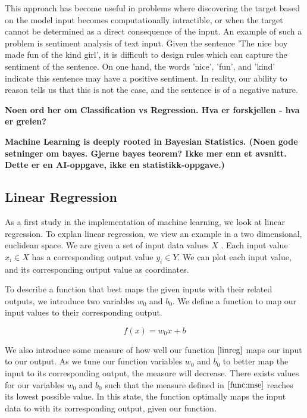 This approach has become useful in problems where discovering the target based on the model input becomes computationally intractible,
or when the target cannot be determined as a direct consequence of the input. 
An example of such a problem is sentiment analysis of text input. 
Given the sentence 'The nice boy made fun of the kind girl', 
it is difficult to design rules which can capture the sentiment of the sentence.
On one hand, the words 'nice', 'fun', and 'kind' indicate this sentence may have a positive sentiment.
In reality, our ability to reason tells us that this is not the case, and the sentence is of a negative nature.

\textbf{Noen ord her om Classification vs Regression. Hva er forskjellen - hva er greien?}


\textbf{Machine Learning is deeply rooted in Bayesian Statistics. (Noen gode setninger om bayes. Gjerne bayes teorem? Ikke mer enn et avsnitt. Dette er en AI-oppgave, ikke en statistikk-oppgave.)}


\subsection{Linear Regression}
\label{subsection:linreg}

As a first study in the implementation of machine learning, we look at linear regression.
To explan linear regression, we view an example in a two dimensional, euclidean space.
We are given a set of input data values $ X $ . Each input value $ x_i \in X $ has a corresponding output value $ y_i \in Y $.
We can plot each input value, and its corresponding output value as coordinates.


To describe a function that best maps the given inputs with their related outputs, 
we introduce two variables $ w_0 $ and $ b_0 $. We define a function to map our input values to their corresponding output.

\[
        f(x) = w_0x + b \tag{2.1} \label{linreg}
\]

We also introduce some measure of how well our function $ \eqref{linreg} $
maps our input to our output. As we tune our function variables $ w_0 $ and $ b_0 $ to better map the input to its corresponding output,
the measure will decrease. There exists values for our variables $ w_0 $ and $ b_0 $  such that the measure defined in $ \ref{func:mse} $ reaches its lowest possible value.
In this state, the function optimally maps the input data to with its corresponding output, given our function.

